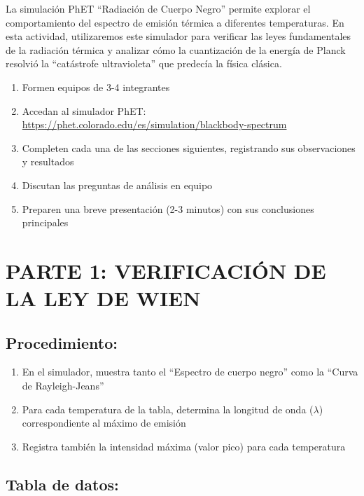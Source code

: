 \documentclass[12pt,a4paper]{article}
\begin{document}
	La simulación PhET ``Radiación de Cuerpo Negro'' permite explorar el comportamiento del espectro de emisión térmica a diferentes temperaturas. En esta actividad, utilizaremos este simulador para verificar las leyes fundamentales de la radiación térmica y analizar cómo la cuantización de la energía de Planck resolvió la ``catástrofe ultravioleta'' que predecía la física clásica.
	
	\begin{instruccionbox}
		\begin{enumerate}
			\item Formen equipos de 3-4 integrantes
			\item Accedan al simulador PhET: \url{https://phet.colorado.edu/es/simulation/blackbody-spectrum}
			\item Completen cada una de las secciones siguientes, registrando sus observaciones y resultados
			\item Discutan las preguntas de análisis en equipo
			\item Preparen una breve presentación (2-3 minutos) con sus conclusiones principales
		\end{enumerate}
	\end{instruccionbox}
	
	\newpage
	
	\section{PARTE 1: VERIFICACIÓN DE LA LEY DE WIEN}
	
	\subsection{Procedimiento:}
	\begin{enumerate}
		\item En el simulador, muestra tanto el ``Espectro de cuerpo negro'' como la ``Curva de Rayleigh-Jeans''
		\item Para cada temperatura de la tabla, determina la longitud de onda ($\lambda$) correspondiente al máximo de emisión
		\item Registra también la intensidad máxima (valor pico) para cada temperatura
	\end{enumerate}
	
	\subsection{Tabla de datos:}
	
\end{document}
